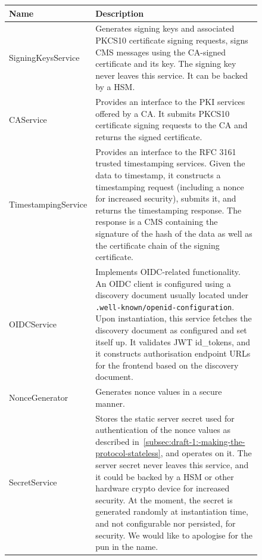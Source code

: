 \begin{figure}[H]
    \begin{center}
        \begin{tabular}{p{4.2cm}|p{12cm}}
            \textbf{Name} & \textbf{Description}
            \\ \hline
            SigningKeysService &
            Generates signing keys and associated \gls{PKCS10} certificate signing requests,
            signs \gls{CMS} messages using the \gls{CA}-signed certificate and its key.
            The signing key never leaves this service.
            It can be backed by a \gls{HSM}.
            \\ \hline
            CAService &
            Provides an interface to the \gls{PKI} services offered by a \gls{CA}.
            It submits \gls{PKCS10} certificate signing requests to the \gls{CA} and returns the signed certificate.
            \\ \hline
            TimestampingService &
            Provides an interface to the \gls{RFC} 3161 trusted timestamping services.
            Given the data to timestamp, it constructs a timestamping request (including a nonce for increased security),
            submits it, and returns the timestamping response.
            The response is a \gls{CMS} containing the signature of the hash of the data
            as well as the certificate chain of the signing certificate.
            \\ \hline
            OIDCService &
            Implements \gls{OIDC}-related functionality.
            An \gls{OIDC} client is configured using a discovery document usually located under \texttt{.well-known/openid-configuration}.
            Upon instantiation,
            this service fetches the discovery document as configured and set itself up.
            It validates \gls{JWT} id\_tokens,
            and it constructs authorisation endpoint \gls{URL}s for the frontend based on the discovery document.
            \\ \hline
            NonceGenerator &
            Generates nonce values in a secure manner.
            \\ \hline
            SecretService &
            Stores the static server secret used for authentication of the nonce values as described in~\ref{subsec:draft-1:-making-the-protocol-stateless},
            and operates on it.
            The server secret never leaves this service,
            and it could be backed by a \gls{HSM} or other hardware crypto device for increased security.
            At the moment, the secret is generated randomly at instantiation time, and not configurable nor persisted,
            for security.
            We would like to apologise for the pun in the name.
        \end{tabular}
    \end{center}
\end{figure}

